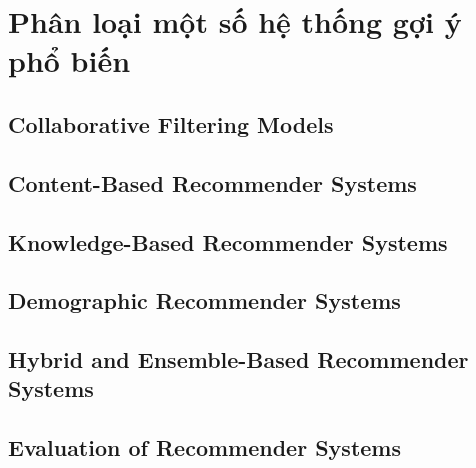 \documentclass[14pt]{article}
\begin{document}
	\section{Phân loại một số hệ thống gợi ý phổ biến}
	
		\subsection{Collaborative Filtering Models}
		
		\subsection{Content-Based Recommender Systems}
		
		\subsection{Knowledge-Based Recommender Systems}
		
		\subsection{Demographic Recommender Systems}
		
		\subsection{Hybrid and Ensemble-Based Recommender Systems}
		
		\subsection{Evaluation of Recommender Systems}
\end{document}
